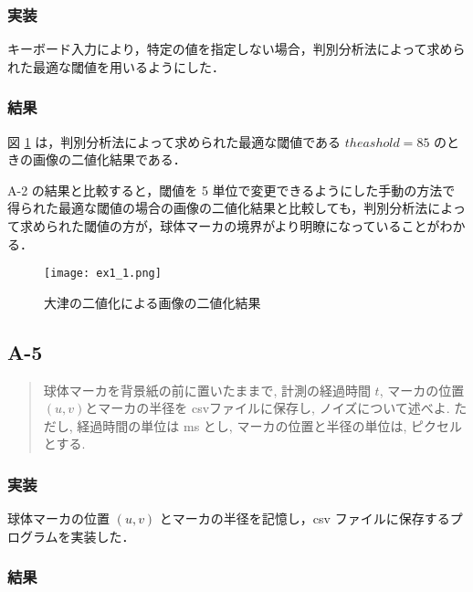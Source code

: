 \documentclass[fleqn, a4paper. 12pt]{jsarticle}
\begin{document}
      \subsubsection*{実装}

        キーボード入力により，特定の値を指定しない場合，判別分析法によって求められた最適な閾値を用いるようにした．

      \subsubsection*{結果}

        図 \ref{fig:s1} は，判別分析法によって求められた最適な閾値である $theashold = 85$ のときの画像の二値化結果である．

        A-2 の結果と比較すると，閾値を 5 単位で変更できるようにした手動の方法で得られた最適な閾値の場合の画像の二値化結果と比較しても，判別分析法によって求められた閾値の方が，球体マーカの境界がより明瞭になっていることがわかる．
        
        \begin{figure}[!h]
          \centering
          \texttt{[image: ex1\_1.png]}
          \caption{大津の二値化による画像の二値化結果}
          \label{fig:s1}
        \end{figure}

    \subsection*{A-5}

      \begin{quote}
        球体マーカを背景紙の前に置いたままで, 計測の経過時間 \( t \), マーカの位置\( (u, v) \)とマーカの半径を csvファイルに保存し, ノイズについて述べよ. ただし, 経過時間の単位は ms とし, マーカの位置と半径の単位は, ピクセルとする.
      \end{quote}

      \subsubsection*{実装}

        球体マーカの位置 \( (u, v) \) とマーカの半径を記憶し，csv ファイルに保存するプログラムを実装した．

      \subsubsection*{結果}
\end{document}
